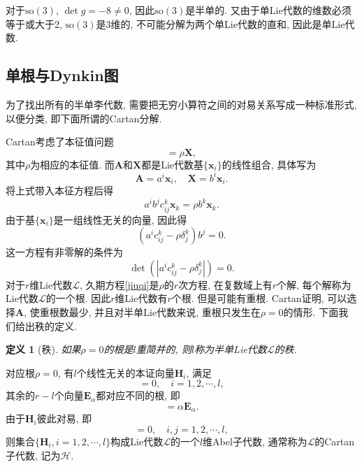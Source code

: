 \documentclass[UTF8]{ctexart}
\newtheorem{define}{定义}
\begin{document}
对于$\mathrm{so}(3)$, $\det g = -8 \neq 0$, 因此$\mathrm{so}(3)$是半单的. 又由于单Lie代数的维数必须等于或大于2, $\mathrm{so}(3)$是3维的, 不可能分解为两个单Lie代数的直和, 因此是单Lie代数.

\subsection{单根与Dynkin图}
为了找出所有的半单李代数, 需要把无穷小算符之间的对易关系写成一种标准形式, 以便分类, 即下面所谓的Cartan分解.

Cartan考虑了本征值问题
\begin{equation}
  [\bm{A}, \bm{X}] = \rho \bm{X},
\end{equation}
其中$\rho$为相应的本征值. 而$\bm{A}$和$\bm{X}$都是Lie代数基$\{\bm{x}_i\}$的线性组合, 具体写为
\begin{equation}
  \bm{A} = a^i\bm{x}_i, \quad \bm{X} = b^i \bm{x}_i.
\end{equation}
将上式带入本征方程后得
\begin{equation}
  a^i b^j c_{ij}^k \bm{x}_k = \rho b^k \bm{x}_k.
\end{equation}
由于基$\{\bm{x}_i\}$是一组线性无关的向量, 因此得
\begin{equation}
  (a^i c_{ij}^k - \rho \delta_j^k)b^j = 0.
\end{equation}
这一方程有非零解的条件为
\begin{equation}\label{jiuqi}
  \det (|a^i c_{ij}^k - \rho \delta_j^k|) = 0.
\end{equation}
对于$r$维Lie代数$\mathcal{L}$, 久期方程\eqref{jiuqi}是$\rho$的$r$次方程, 在复数域上有$r$个解, 每个解称为Lie代数$\mathcal{L}$的一个根. 因此$r$维Lie代数有$r$个根. 但是可能有重根. Cartan证明, 可以选择$\bm{A}$, 使重根数最少, 并且对半单Lie代数来说, 重根只发生在$\rho = 0$的情形. 下面我们给出秩的定义.
\begin{define}[秩]
  如果$\rho=0$的根是$l$重简并的, 则$l$称为半单Lie代数$\mathcal{L}$的秩.
\end{define}

对应根$\rho = 0$, 有$l$个线性无关的本证向量$\bm{H}_i$, 满足
\begin{equation}
  [\bm{A}, \bm{H}_i] = 0, \quad i = 1, 2, \cdots, l,
\end{equation}
其余的$r-l$个向量$\bm{E}_\alpha$都对应不同的根, 即
\begin{equation}
  [\bm{A}, \bm{E}_\alpha] = \alpha \bm{E}_\alpha.
\end{equation}
由于$\bm{H}_i$彼此对易, 即
\begin{equation}
  [\bm{H}_i, \bm{H}_j] = 0, \quad i,j = 1, 2, \cdots, l,
\end{equation}
则集合$\{\bm{H}_i, i = 1, 2, \cdots, l\}$构成Lie代数$\mathcal{L}$的一个$l$维Abel子代数, 通常称为$\mathcal{L}$的Cartan子代数, 记为$\mathcal{H}$.
\end{document}
